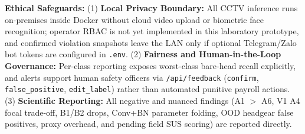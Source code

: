 \noindent\textbf{Ethical Safeguards:} (1) \textbf{Local Privacy Boundary:} All CCTV inference runs on-premises inside Docker without cloud video upload or biometric face recognition; operator RBAC is not yet implemented in this laboratory prototype, and confirmed violation snapshots leave the LAN only if optional Telegram/Zalo bot tokens are configured in \texttt{.env}. (2) \textbf{Fairness and Human-in-the-Loop Governance:} Per-class reporting exposes worst-class bare-head recall explicitly, and alerts support human safety officers via \texttt{/api/feedback} (\texttt{confirm}, \texttt{false\_positive}, \texttt{edit\_label}) rather than automated punitive payroll actions. (3) \textbf{Scientific Reporting:} All negative and nuanced findings (A1 $>$ A6, V1 A4 focal trade-off, B1/B2 drops, Conv+BN parameter folding, OOD headgear false positives, proxy overhead, and pending field SUS scoring) are reported directly.
